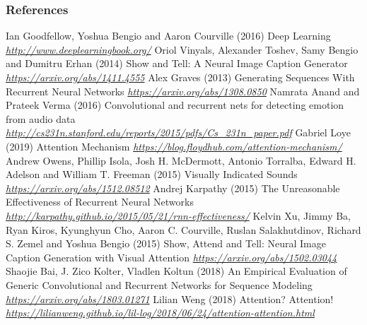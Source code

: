 \begin{vbframe}
\frametitle{References}
\footnotesize{
\begin{thebibliography}{99}
 Ian Goodfellow, Yoshua Bengio and Aaron Courville (2016)
\newblock Deep Learning
\newblock \emph{\url{http://www.deeplearningbook.org/}}
 Oriol Vinyals, Alexander Toshev, Samy Bengio and Dumitru Erhan (2014)
\newblock Show and Tell: A Neural Image Caption Generator
\newblock \emph{\url{https://arxiv.org/abs/1411.4555}}
 Alex Graves (2013)
\newblock Generating Sequences With Recurrent Neural Networks
\newblock \emph{\url{https://arxiv.org/abs/1308.0850}}
 Namrata Anand and Prateek Verma (2016)
\newblock Convolutional and recurrent nets for detecting emotion from audio data
\newblock \emph{\url{http://cs231n.stanford.edu/reports/2015/pdfs/Cs_231n_paper.pdf}}
 Gabriel Loye (2019)
\newblock Attention Mechanism
\newblock \emph{\url{https://blog.floydhub.com/attention-mechanism/}}
 Andrew Owens, Phillip Isola, Josh H. McDermott, Antonio Torralba, Edward H. Adelson and  William T. Freeman (2015)
\newblock Visually Indicated Sounds
\newblock \emph{\url{https://arxiv.org/abs/1512.08512}}
 Andrej Karpathy (2015)
\newblock The Unreasonable Effectiveness of Recurrent Neural Networks
\newblock \emph{\url{http://karpathy.github.io/2015/05/21/rnn-effectiveness/}}
 Kelvin Xu, Jimmy Ba, Ryan Kiros, Kyunghyun Cho, Aaron C. Courville, Ruslan Salakhutdinov, Richard S. Zemel and  Yoshua Bengio (2015)
\newblock Show, Attend and Tell: Neural Image Caption Generation with Visual Attention
\newblock \emph{\url{https://arxiv.org/abs/1502.03044}}
 Shaojie Bai, J. Zico Kolter, Vladlen Koltun (2018)
\newblock An Empirical Evaluation of Generic Convolutional and Recurrent Networks for Sequence Modeling
\newblock \emph{\url{https://arxiv.org/abs/1803.01271}}
 Lilian Weng (2018)
\newblock Attention? Attention!
\newblock \emph{\url{https://lilianweng.github.io/lil-log/2018/06/24/attention-attention.html}}
\end{thebibliography}
}
\end{vbframe}

\endlecture

